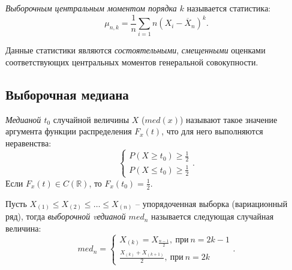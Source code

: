 \begin{definition}
  \textit{Выборочным центральным моментом порядка $k$} называется статистика:
  \[
    \mu_{n, k} = \frac{1}{n} \sum\limits_{i = 1}{n} (X_i - \overline{X}_n)^k
  .\]
\end{definition}

Данные статистики являются \textit{состоятельными}, \textit{смещенными} оценками
соответствующих центральных моментов генеральной совокупности.



\subsection{Выборочная медиана}

\begin{definition}
  \textit{Медианой $t_0$} случайной величины $X$ ($med(x)$) называют такое значение
  аргумента функции распределения $F_x(t)$, что для него выполняются
  неравенства:
  \[
    \begin{cases}
      P(X \geqslant t_0) \geqslant \frac{1}{2}\\
      P(X \leqslant t_0) \geqslant \frac{1}{2}
    \end{cases}
  .\]
  Если $F_x(t) \in C(\mathbb{R})$, то $F_x(t_0) = \frac{1}{2}$.
\end{definition}

\begin{definition}
  Пусть $X_{(1)} \leqslant X_{(2)} \leqslant \ldots \leqslant X_{(n)}$ --
  упорядоченная выборка (вариационный ряд), тогда \textit{выборочной vедианой
  $med_n$} называется следующая случайная величина:
  \[
    med_n = \begin{cases}
      X_{(k)} = X_{\frac{n - 1}{2}},~ \text{при}~ n = 2k - 1\\
      \frac{X_{(k)} + X_{(k + 1)}}{2},~ \text{при}~ n = 2k
    \end{cases}
  .\]
\end{definition}

